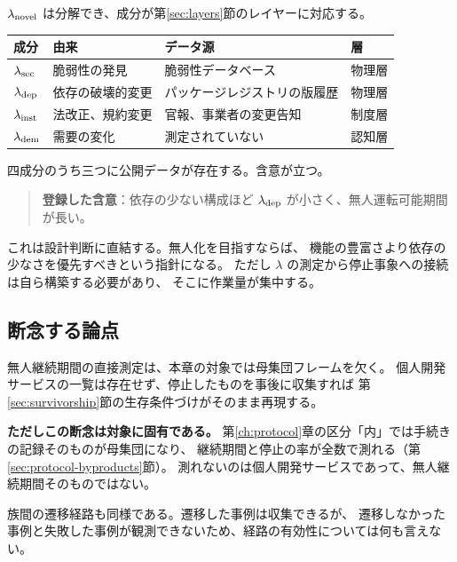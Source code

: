 $\lambda_{\rm novel}$ は分解でき、成分が第\ref{sec:layers}節のレイヤーに対応する。

\begin{center}
\begin{tabularx}{\textwidth}{@{}llXl@{}}
\toprule
成分 & 由来 & データ源 & 層 \\
\midrule
$\lambda_{\rm sec}$ & 脆弱性の発見 & 脆弱性データベース & 物理層 \\
$\lambda_{\rm dep}$ & 依存の破壊的変更 & パッケージレジストリの版履歴 & 物理層 \\
$\lambda_{\rm inst}$ & 法改正、規約変更 & 官報、事業者の変更告知 & 制度層 \\
$\lambda_{\rm dem}$ & 需要の変化 & 測定されていない & 認知層 \\
\bottomrule
\end{tabularx}
\label{tab:lambda-novel-decomposition}
\end{center}

四成分のうち三つに公開データが存在する。含意が立つ。

\begin{quote}
\textbf{登録した含意}：依存の少ない構成ほど $\lambda_{\rm dep}$ が小さく、無人運転可能期間が長い。
\end{quote}

これは設計判断に直結する。無人化を目指すならば、
機能の豊富さより依存の少なさを優先すべきという指針になる。
ただし $\lambda$ の測定から停止事象への接続は自ら構築する必要があり、
そこに作業量が集中する。

\subsection{断念する論点}

無人継続期間の直接測定は、本章の対象では母集団フレームを欠く。
個人開発サービスの一覧は存在せず、停止したものを事後に収集すれば
第\ref{sec:survivorship}節の生存条件づけがそのまま再現する。

\textbf{ただしこの断念は対象に固有である。}
第\ref{ch:protocol}章の区分「内」では手続きの記録そのものが母集団になり、
継続期間と停止の率が全数で測れる（第\ref{sec:protocol-byproducts}節）。
測れないのは個人開発サービスであって、無人継続期間そのものではない。

族間の遷移経路も同様である。遷移した事例は収集できるが、
遷移しなかった事例と失敗した事例が観測できないため、経路の有効性については何も言えない。


